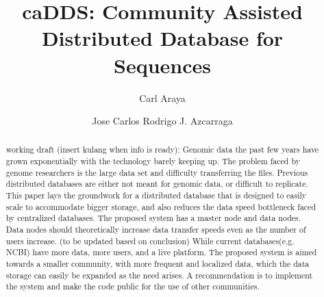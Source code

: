 \documentclass[acmsmall]{acmart}
\begin{document}
\title{caDDS: Community Assisted Distributed Database for Sequences}

\author{Carl Araya}

\author{Jose Carlos Rodrigo J. Azcarraga}
\authornotemark[1]


\renewcommand{\shortauthors}{Araya and Azcarraga}

\begin{abstract}
working draft (insert kulang when info is ready):
 Genomic data the past few years have grown exponentially with the technology barely keeping up. The problem faced by genome researchers is the large data set and difficulty transferring the files. Previous distributed databases are either not meant for genomic data, or difficult to replicate. This paper lays the groundwork for a distributed database that is designed to easily scale to accommodate bigger storage, and also reduces the data speed bottleneck faced by centralized databases. The proposed system has a master node and data nodes. Data nodes should theoretically increase data transfer speeds even as the number of users increase. (to be updated based on conclusion) While current databases(e.g. NCBI) have more data, more users, and a live platform. The proposed system is aimed towards a smaller community, with more frequent and localized data, which the data storage can easily be expanded as the need arises. A recommendation is to implement the system and make the code public for the use of other communities.
\end{abstract}
\end{document}
